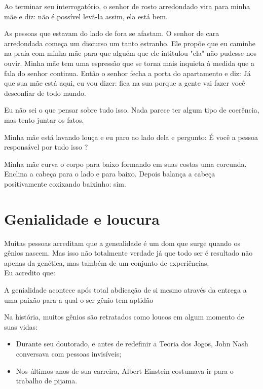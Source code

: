 \documentclass[11pt]{book}
\begin{document}
Ao terminar seu interrogatório, o senhor de rosto arredondado vira para minha mãe e diz: não é possível levá-la assim, ela está bem.

As pessoas que estavam do lado de fora se afastam. O senhor de cara arredondada começa um discurso um tanto estranho. Ele propõe que eu caminhe na praia com minha mãe para que alguém que ele intitulou "ela" não pudesse nos ouvir. Minha mãe tem uma espressão que se torna mais inquieta à medida que a fala do senhor continua. Então o senhor fecha a porta do apartamento e diz: Já que sua mãe está aqui, eu vou dizer: fica na sua porque a gente vai fazer você desconfiar de todo mundo. 

Eu não sei o que pensar sobre tudo isso. Nada parece ter algum tipo de coerência, mas tento juntar os fatos.

Minha mãe está lavando louça e eu paro ao lado dela e pergunto: É você a pessoa responsável por tudo isso ? 

Minha mãe curva o corpo para baixo formando em suas costas uma corcunda. Enclina a cabeça para o lado e para baixo. Depois balança a cabeça positivamente coxixando baixinho: sim.

\chapter{Genialidade e loucura}

Muitas pessoas acreditam que a genealidade é um dom que surge quando os gênios nascem. Mas isso não totalmente verdade já que todo ser é resultado não apenas da genética, mas também de um conjunto de experiências. \\

Eu acredito que:

\noindent \begin{center} A genialidade acontece após total abdicação de si mesmo através da entrega a uma paixão para a qual o ser gênio tem aptidão \end{center} 

Na história, muitos gênios são retratados como loucos em algum momento de suas vidas:

\begin{itemize}
\item Durante seu doutorado, e antes de redefinir a Teoria dos Jogos, John Nash conversava com pessoas invisíveis; 
\item Nos últimos anos de sua carreira, Albert Einstein costumava ir para o trabalho de pijama. 
\end{itemize}
\end{document}
